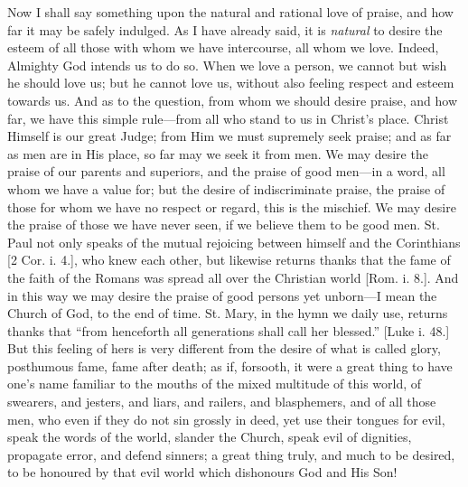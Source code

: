 Now I shall say something upon the natural and rational love of
praise, and how far it may be safely indulged. As I have already said,
it is \emph{natural} to desire the esteem of all those with whom we
have intercourse, all whom we love. Indeed, Almighty God intends us to
do so. When we love a person, we cannot but wish he should love us;
but he cannot love us, without also feeling respect and esteem towards
us. And as to the question, from whom we should desire praise, and how
far, we have this simple rule—from all who stand to us in Christ's
place. Christ Himself is our great Judge; from Him we must supremely
seek praise; and as far as men are in His place, so far may we seek it
from men. We may desire the praise of our parents and superiors, and
the praise of good men—in a word, all whom we have a value for; but
the desire of indiscriminate praise, the praise of those for whom we
have no respect or regard, this is the mischief. We may desire the
praise of those we have never seen, if we believe them to be good men.
St. Paul not only speaks of the mutual rejoicing between himself and
the Corinthians [2 Cor. i. 4.], who knew each other, but likewise
returns thanks that the fame of the faith of the Romans was spread all
over the Christian world [Rom. i. 8.]. And in this way we may desire
the praise of good persons yet unborn—I mean the Church of God, to
the end of time. St. Mary, in the hymn we daily use, returns thanks
that ``from henceforth all generations shall call her
blessed.'' [Luke i. 48.] But this feeling of hers is very
different from the desire of what is called glory, posthumous fame,
fame after death; as if, forsooth, it were a great thing to have one's
name familiar to the mouths of the mixed multitude of this world, of
swearers, and jesters, and liars, and railers, and blasphemers, and of
all those men, who even if they do not sin grossly in deed, yet use
their tongues for evil, speak the words of the world, slander the
Church, speak evil of dignities, propagate error, and defend sinners;
a great thing truly, and much to be desired, to be honoured by that
evil world which dishonours God and His Son!


